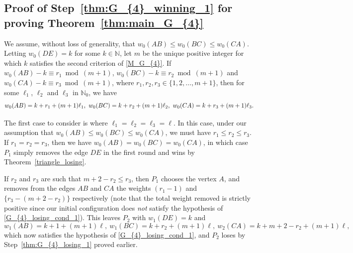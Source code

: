 \documentclass[11pt,reqno]{amsart}
\theoremstyle{definition}
\theoremstyle{definition}
\begin{document}
\subsection{Proof of Step~\eqref{thm:G_{4}_winning_1} for proving Theorem~\ref{thm:main_G_{4}}}
We assume, without loss of generality, that $w_{0}(AB) \leqslant w_{0}(BC) \leqslant w_{0}(CA)$. Letting $w_{0}(DE)=k$ for some $k \in \mathbb{N}$, let $m$ be the unique positive integer for which $k$ satisfies the second criterion of \eqref{M_G_{4}}. If $w_{0}(AB)-k\equiv r_{1}\bmod (m+1)$, $w_{0}(BC)-k\equiv r_{2}\bmod(m+1)$ and $w_{0}(CA)-k\equiv r_{3}\bmod(m+1)$, where $r_{1}, r_{2}, r_{3} \in \{1,2,\ldots,m+1\}$, then for some $\ell_{1}$, $\ell_{2}$ and $\ell_{3}$ in $\mathbb{N}_{0}$, we have
\begin{equation}
w_{0}(AB)=k+r_{1}+(m+1)\ell_{1},\ w_{0}(BC)=k+r_{2}+(m+1)\ell_{2},\ w_{0}(CA)=k+r_{3}+(m+1)\ell_{3}.\label{G_{4}_winning_1_eq_1}
\end{equation}

The first case to consider is where $\ell_{1}=\ell_{2}=\ell_{3}=\ell$. In this case, under our assumption that $w_{0}(AB) \leqslant w_{0}(BC) \leqslant w_{0}(CA)$, we must have $r_{1} \leqslant r_{2} \leqslant r_{3}$. If $r_{1}=r_{2}=r_{3}$, then we have $w_{0}(AB)=w_{0}(BC)=w_{0}(CA)$, in which case $P_{1}$ simply removes the edge $DE$ in the first round and wins by Theorem~\ref{triangle_losing}.

If $r_{2}$ and $r_{3}$ are such that $m+2-r_{2} \leqslant r_{3}$, then $P_{1}$ chooses the vertex $A$, and removes from the edges $AB$ and $CA$ the weights $(r_{1}-1)$ and $\{r_{3}-(m+2-r_{2})\}$ respectively (note that the total weight removed is strictly positive since our initial configuration does \emph{not} satisfy the hypothesis of \eqref{G_{4}_losing_cond_1}). This leaves $P_{2}$ with $w_{1}(DE)=k$ and 
\begin{equation}
w_{1}(AB)=k+1+(m+1)\ell,\ w_{1}(BC)=k+r_{2}+(m+1)\ell,\ w_{2}(CA)=k+m+2-r_{2}+(m+1)\ell,\nonumber
\end{equation}
which now satisfies the hypothesis of \eqref{G_{4}_losing_cond_1}, and $P_{2}$ loses by Step~\eqref{thm:G_{4}_losing_1} proved earlier.
\end{document}
